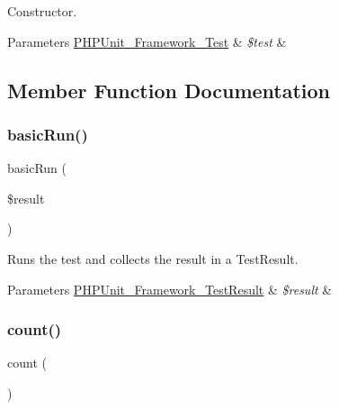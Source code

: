 Constructor.


\begin{DoxyParams}[1]{Parameters}
\mbox{\hyperlink{interface_p_h_p_unit___framework___test}{P\+H\+P\+Unit\+\_\+\+Framework\+\_\+\+Test}} & {\em \$test} & \\
\hline
\end{DoxyParams}


\subsection{Member Function Documentation}
\mbox{\label{class_p_h_p_unit___extensions___test_decorator_a12d49d0810ab4ed5519fac7f947c3da3}} 
\subsubsection{\texorpdfstring{basic\+Run()}{basicRun()}}
{\footnotesize\ttfamily basic\+Run (\begin{DoxyParamCaption}\item[{\mbox{\hyperlink{class_p_h_p_unit___framework___test_result}{P\+H\+P\+Unit\+\_\+\+Framework\+\_\+\+Test\+Result}}}]{\$result }\end{DoxyParamCaption})}

Runs the test and collects the result in a Test\+Result.


\begin{DoxyParams}[1]{Parameters}
\mbox{\hyperlink{class_p_h_p_unit___framework___test_result}{P\+H\+P\+Unit\+\_\+\+Framework\+\_\+\+Test\+Result}} & {\em \$result} & \\
\hline
\end{DoxyParams}
\mbox{\label{class_p_h_p_unit___extensions___test_decorator_ac751e87b3d4c4bf2feb03bee8b092755}} 
\subsubsection{\texorpdfstring{count()}{count()}}
{\footnotesize\ttfamily count (\begin{DoxyParamCaption}{ }\end{DoxyParamCaption})}

